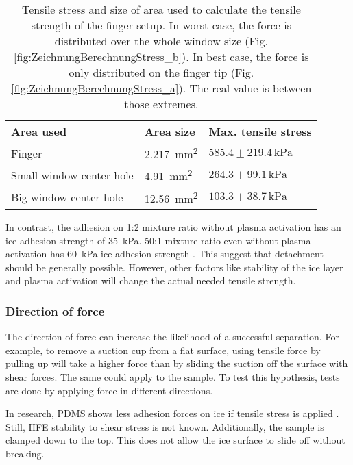 \begin{table}[hbt!]
	\centering
	\begin{tabular}{|l|l|l|}
		\hline
		Area used & Area size & Max. tensile stress\\
		\hline
		\hline
		Finger & \SI{2.217}{\milli\meter\squared} & $585.4\pm219.4\,\si{\kilo\pascal}$ \\ 
		\hline
		Small window center hole & \SI{4.91}{\milli\meter\squared} & $264.3\pm99.1\,\si{\kilo\pascal}$ \\ 
		\hline
		Big window center hole & \SI{12.56}{\milli\meter\squared} & $103.3\pm38.7\,\si{\kilo\pascal}$ \\ 
		\hline
	\end{tabular}
	\caption{Tensile stress and size of area used to calculate the tensile strength of the finger setup. In worst case, the force is distributed over the whole window size (Fig. \ref{fig:ZeichnungBerechnungStress_b}). In best case, the force is only distributed on the finger tip (Fig. \ref{fig:ZeichnungBerechnungStress_a}). The real value is between those extremes.}
	\label{table:VerschAbschätzungenStressFinger}
\end{table}

In contrast, the adhesion on 1:2 mixture ratio without plasma activation has an ice adhesion strength of \SI{35}{\kilo\pascal}. 50:1 mixture ratio even without plasma activation has \SI{60}{\kilo\pascal} ice adhesion strength \cite{IbanezIbanez.2022}. This suggest that detachment should be generally possible. However, other factors like stability of the ice layer and plasma activation will change the actual needed tensile strength. 
\FloatBarrier

\subsubsection{Direction of force}

The direction of force can increase the likelihood of a successful separation. For example, to remove a suction cup from a flat surface, using tensile force by pulling up will take a higher force than by sliding the suction off the surface with shear forces. The same could apply to the sample. To test this hypothesis, tests are done by applying force in different directions.

In research, PDMS shows less adhesion forces on ice if tensile stress is applied \cite{IbanezIbanez.2022}. Still, HFE stability to shear stress is not known. Additionally, the sample is clamped down to the top. This does not allow the ice surface to slide off without breaking.

